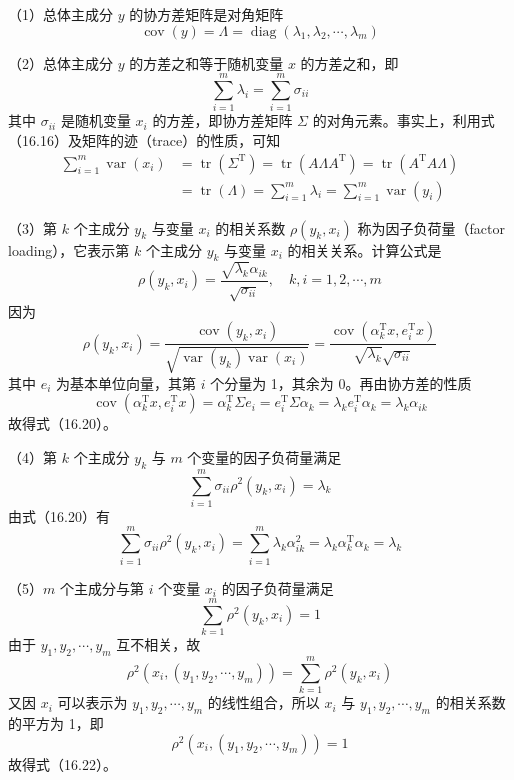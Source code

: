 \documentclass[UTF8, 12pt, fontset=fandol, oneside]{ctexart}
\begin{document}
（1）总体主成分 $y$ 的协方差矩阵是对角矩阵
\begin{equation}
\operatorname{cov}(y)=\Lambda=\operatorname{diag}(\lambda_1,\lambda_2,\cdots,\lambda_m)
\tag{16.17}
\end{equation}

（2）总体主成分 $y$ 的方差之和等于随机变量 $x$ 的方差之和，即
\begin{equation}
\sum_{i=1}^m\lambda_i=\sum_{i=1}^m\sigma_{ii}
\tag{16.18}
\end{equation}
其中 $\sigma_{ii}$ 是随机变量 $x_i$ 的方差，即协方差矩阵 $\Sigma$ 的对角元素。事实上，利用式（16.16）及矩阵的迹（trace）的性质，可知
\begin{equation}
\begin{aligned}
\sum_{i=1}^m\operatorname{var}(x_i)
&=\operatorname{tr}(\Sigma^{\mathrm{T}})
=\operatorname{tr}(A\Lambda A^{\mathrm{T}})
=\operatorname{tr}(A^{\mathrm{T}}A\Lambda)\\
&=\operatorname{tr}(\Lambda)
=\sum_{i=1}^m\lambda_i
=\sum_{i=1}^m\operatorname{var}(y_i)
\end{aligned}
\tag{16.19}
\end{equation}

（3）第 $k$ 个主成分 $y_k$ 与变量 $x_i$ 的相关系数 $\rho(y_k,x_i)$ 称为因子负荷量（factor loading），它表示第 $k$ 个主成分 $y_k$ 与变量 $x_i$ 的相关关系。计算公式是
\begin{equation}
\rho(y_k,x_i)=\frac{\sqrt{\lambda_k}\alpha_{ik}}{\sqrt{\sigma_{ii}}},\quad k,i=1,2,\cdots,m
\tag{16.20}
\end{equation}
因为
\[
\rho(y_k,x_i)=\frac{\operatorname{cov}(y_k,x_i)}{\sqrt{\operatorname{var}(y_k)\operatorname{var}(x_i)}}
=\frac{\operatorname{cov}(\alpha_k^{\mathrm{T}}x,e_i^{\mathrm{T}}x)}{\sqrt{\lambda_k}\sqrt{\sigma_{ii}}}
\]
其中 $e_i$ 为基本单位向量，其第 $i$ 个分量为 1，其余为 0。再由协方差的性质
\[
\operatorname{cov}(\alpha_k^{\mathrm{T}}x,e_i^{\mathrm{T}}x)
=\alpha_k^{\mathrm{T}}\Sigma e_i
=e_i^{\mathrm{T}}\Sigma\alpha_k
=\lambda_k e_i^{\mathrm{T}}\alpha_k
=\lambda_k\alpha_{ik}
\]
故得式（16.20）。

（4）第 $k$ 个主成分 $y_k$ 与 $m$ 个变量的因子负荷量满足
\begin{equation}
\sum_{i=1}^m\sigma_{ii}\rho^2(y_k,x_i)=\lambda_k
\tag{16.21}
\end{equation}
由式（16.20）有
\[
\sum_{i=1}^m\sigma_{ii}\rho^2(y_k,x_i)
=\sum_{i=1}^m\lambda_k\alpha_{ik}^2
=\lambda_k\alpha_k^{\mathrm{T}}\alpha_k
=\lambda_k
\]

（5）$m$ 个主成分与第 $i$ 个变量 $x_i$ 的因子负荷量满足
\begin{equation}
\sum_{k=1}^m\rho^2(y_k,x_i)=1
\tag{16.22}
\end{equation}
由于 $y_1,y_2,\cdots,y_m$ 互不相关，故
\[
\rho^2(x_i,(y_1,y_2,\cdots,y_m))=\sum_{k=1}^m\rho^2(y_k,x_i)
\]
又因 $x_i$ 可以表示为 $y_1,y_2,\cdots,y_m$ 的线性组合，所以 $x_i$ 与 $y_1,y_2,\cdots,y_m$ 的相关系数的平方为 1，即
\[
\rho^2(x_i,(y_1,y_2,\cdots,y_m))=1
\]
故得式（16.22）。
\end{document}
